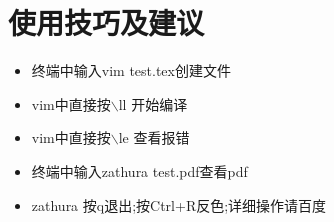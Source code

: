 \documentclass[UTF_8]{ctexart}
\begin{document}
\clearpage
\section{使用技巧及建议}
\begin{itemize}
		\item 终端中输入vim test.tex创建文件
		\item vim中直接按$\backslash$ll 开始编译 
		\item vim中直接按$\backslash$le 查看报错
		\item 终端中输入zathura test.pdf查看pdf
		\item zathura 按q退出;按Ctrl+R反色;详细操作请百度
\end{itemize}
\small
\heiti
{}
\end{document}
